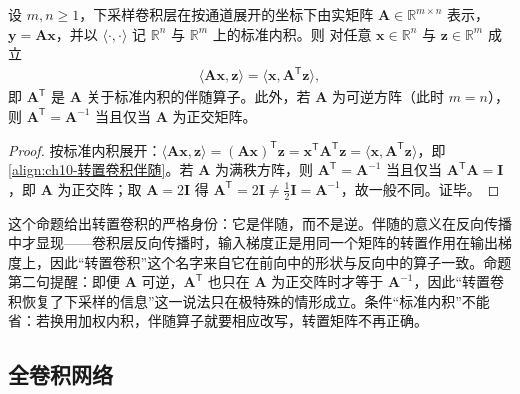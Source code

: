 \documentclass[../../main.tex]{subfiles}
\begin{document}
\begin{proposition}[转置卷积是下采样卷积的伴随算子]\label{proposition:ch10-转置卷积伴随}
设 $m,n\geqslant1$，下采样卷积层在按通道展开的坐标下由实矩阵
$\mathbf{A}\in\mathbb{R}^{m\times n}$ 表示，$\mathbf{y}=\mathbf{A}\mathbf{x}$，并以
$\langle\cdot,\cdot\rangle$ 记 $\mathbb{R}^{n}$ 与 $\mathbb{R}^{m}$ 上的标准内积。则
对任意 $\mathbf{x}\in\mathbb{R}^{n}$ 与 $\mathbf{z}\in\mathbb{R}^{m}$ 成立
\begin{align}
  \langle \mathbf{A}\mathbf{x},\mathbf{z}\rangle=\langle \mathbf{x},\mathbf{A}^{\mathsf{T}}\mathbf{z}\rangle,
  \label{align:ch10-转置卷积伴随}
\end{align}
即 $\mathbf{A}^{\mathsf{T}}$ 是 $\mathbf{A}$ 关于标准内积的伴随算子。此外，若
$\mathbf{A}$ 为可逆方阵（此时 $m=n$），则
$\mathbf{A}^{\mathsf{T}}=\mathbf{A}^{-1}$ 当且仅当 $\mathbf{A}$ 为正交矩阵。
\end{proposition}
\begin{proof}
按标准内积展开：$\langle \mathbf{A}\mathbf{x},\mathbf{z}\rangle=(\mathbf{A}\mathbf{x})^{\mathsf{T}}\mathbf{z}=\mathbf{x}^{\mathsf{T}}\mathbf{A}^{\mathsf{T}}\mathbf{z}=\langle \mathbf{x},\mathbf{A}^{\mathsf{T}}\mathbf{z}\rangle$，即\eqref{align:ch10-转置卷积伴随}。若 $\mathbf{A}$ 为满秩方阵，则 $\mathbf{A}^{\mathsf{T}}=\mathbf{A}^{-1}$ 当且仅当 $\mathbf{A}^{\mathsf{T}}\mathbf{A}=\mathbf{I}$，即 $\mathbf{A}$ 为正交阵；取 $\mathbf{A}=2\mathbf{I}$ 得 $\mathbf{A}^{\mathsf{T}}=2\mathbf{I}\neq\frac12\mathbf{I}=\mathbf{A}^{-1}$，故一般不同。证毕。
\end{proof}

\begin{remark}
这个命题给出转置卷积的严格身份：它是伴随，而不是逆。伴随的意义在反向传播中才显现——卷积层反向传播时，输入梯度正是用同一个矩阵的转置作用在输出梯度上，因此“转置卷积”这个名字来自它在前向中的形状与反向中的算子一致。命题第二句提醒：即便 $\mathbf{A}$ 可逆，$\mathbf{A}^{\mathsf{T}}$ 也只在 $\mathbf{A}$ 为正交阵时才等于 $\mathbf{A}^{-1}$，因此“转置卷积恢复了下采样的信息”这一说法只在极特殊的情形成立。条件“标准内积”不能省：若换用加权内积，伴随算子就要相应改写，转置矩阵不再正确。
\end{remark}

\subsection{全卷积网络}\label{subsection:ch10-全卷积网络}
\end{document}
